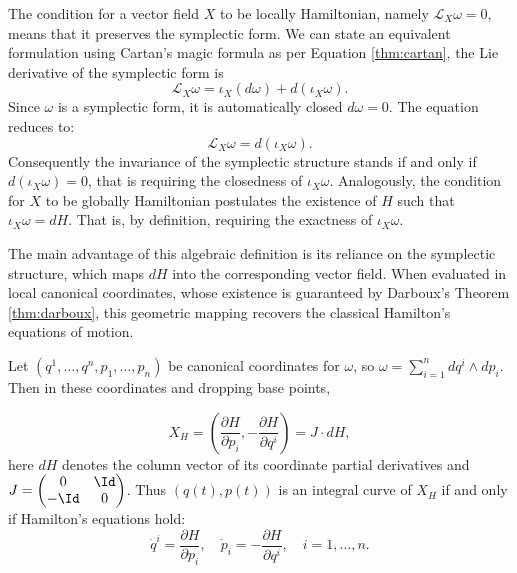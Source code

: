 \begin{remark}
	The condition for a vector field $X$ to be locally Hamiltonian, namely $\mathscr{L}_X\omega = 0$, means that it preserves the symplectic form. We can state an equivalent formulation using Cartan's magic formula as per Equation \eqref{thm:cartan}, the Lie derivative of the symplectic form is
	\[
		\mathscr{L}_X\omega = \iota_X(d\omega) + d(\iota_X\omega).
	\]
	Since $\omega$ is a symplectic form, it is automatically closed $d\omega = 0$. The equation reduces to:
	\[
		\mathscr{L}_X\omega = d(\iota_X\omega).
	\]
	Consequently the invariance of the symplectic structure stands if and only if $d(\iota_X\omega) = 0$, that is requiring the closedness of $\iota_X\omega$. Analogously, the condition for $X$ to be globally Hamiltonian postulates the existence of $H$ such that $\iota_X\omega = dH$. That is, by definition, requiring the exactness of $\iota_X\omega$.
\end{remark}

The main advantage of this algebraic definition is its reliance on the symplectic structure, which maps $dH$ into the corresponding vector field. When evaluated in local canonical coordinates, whose existence is guaranteed by Darboux's Theorem \ref{thm:darboux}, this geometric mapping recovers the classical Hamilton's equations of motion.

\begin{theorem}\label{prop:ham-eq}
Let $(q^1,\ldots,q^n,p_1,\ldots,p_n)$ be canonical coordinates for $\omega$, so $\omega = \sum_{i=1}^n dq^i \wedge dp_i$. Then in these coordinates and dropping base points,

\begin{equation}
	X_H = \left( \frac{\partial H}{\partial p_i}, -\frac{\partial H}{\partial q^i} \right) = J \cdot dH \label{eq:ham-field},
\end{equation}
here $dH$ denotes the column vector of its coordinate partial derivatives and $J = \begin{pmatrix} 0 & \Id \\ -\Id & 0 \end{pmatrix}$. Thus $(q(t),p(t))$ is an integral curve of $X_H$ if and only if Hamilton's equations hold:
\[
\boxed{ \dot{q}^i = \frac{\partial H}{\partial p_i}, \quad \dot{p}_i = -\frac{\partial H}{\partial q^i}, \quad i = 1,\ldots,n.}
\]
\end{theorem}

